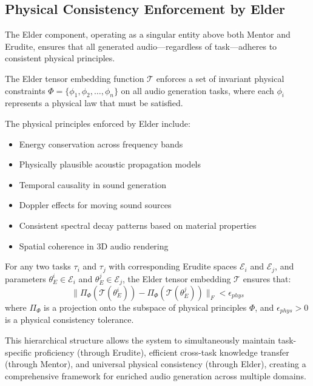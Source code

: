 \subsection{Physical Consistency Enforcement by Elder}

The Elder component, operating as a singular entity above both Mentor and Erudite, ensures that all generated audio—regardless of task—adheres to consistent physical principles.

\begin{definition}
The Elder tensor embedding function $\mathcal{T}$ enforces a set of invariant physical constraints $\Phi = \{\phi_1, \phi_2, \ldots, \phi_n\}$ on all audio generation tasks, where each $\phi_i$ represents a physical law that must be satisfied.
\end{definition}

The physical principles enforced by Elder include:
\begin{itemize}
    \item Energy conservation across frequency bands
    \item Physically plausible acoustic propagation models
    \item Temporal causality in sound generation
    \item Doppler effects for moving sound sources
    \item Consistent spectral decay patterns based on material properties
    \item Spatial coherence in 3D audio rendering
\end{itemize}

\begin{theorem}
For any two tasks $\tau_i$ and $\tau_j$ with corresponding Erudite spaces $\mathcal{E}_i$ and $\mathcal{E}_j$, and parameters $\theta_E^i \in \mathcal{E}_i$ and $\theta_E^j \in \mathcal{E}_j$, the Elder tensor embedding $\mathcal{T}$ ensures that:
\begin{equation}
\| \Pi_{\Phi}(\mathcal{T}(\theta_E^i)) - \Pi_{\Phi}(\mathcal{T}(\theta_E^j)) \|_F < \epsilon_{phys}
\end{equation}
where $\Pi_{\Phi}$ is a projection onto the subspace of physical principles $\Phi$, and $\epsilon_{phys} > 0$ is a physical consistency tolerance.
\end{theorem}

This hierarchical structure allows the system to simultaneously maintain task-specific proficiency (through Erudite), efficient cross-task knowledge transfer (through Mentor), and universal physical consistency (through Elder), creating a comprehensive framework for enriched audio generation across multiple domains.

